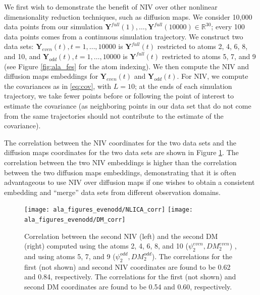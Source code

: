 \documentclass[aip,jcp,reprint,twocolumn]{revtex4-1}
\begin{document}
We first wish to demonstrate the benefit of NIV over other nonlinear dimensionality reduction techniques, such as diffusion maps.
%
We consider 10,000 data points from our simulation $\mathbf{Y}^{full}(1), \dots, \mathbf{Y}^{full}(10000) \in \mathbb{R}^{30}$; every 100 data points comes from a continuous simulation trajectory.
%
We construct two data sets:
%
$\mathbf{Y}_{even}(t), t=1, \dots, 10000$ is $\mathbf{Y}^{full}(t)$ restricted to atoms 2, 4, 6, 8, and 10,
and $\mathbf{Y}_{odd}(t), t=1, \dots, 10000$ is $\mathbf{Y}^{full}(t)$ restricted to atoms 5, 7, and 9 (see Figure \ref{fig:ala_fes} for the atom indexing).
%
We then compute the NIV and diffusion maps embeddings for $\mathbf{Y}_{even}(t)$ and $\mathbf{Y}_{odd}(t)$.
%
For NIV, we compute the covariances as in \eqref{eq:cov}, with $L=10$;
at the ends of each simulation trajectory, we take fewer points before or following the point of interest to estimate the covariance
(as neighboring points in our data set that do not come from the
same trajectories should not contribute to the estimate of the covariance).

The correlation between the NIV coordinates for the two data sets and the diffusion maps coordinates for the two data sets are shown in Figure \ref{fig:ala_corr}.
%
The correlation between the two NIV embeddings is higher than the correlation between the two diffusion maps embeddings,
demonstrating that it is often advantageous to use NIV over diffusion maps if one wishes to obtain a consistent embedding and ``merge'' data sets from different observation domains.

\begin{figure}[ht]
    \texttt{[image: ala\_figures\_evenodd/NLICA\_corr]}
    \texttt{[image: ala\_figures\_evenodd/DM\_corr]}
    \caption{Correlation between the second NIV (left) and the second DM (right) computed using the atoms 2, 4, 6, 8, and 10 ($\psi_2^{even}, DM_2^{even}$) , and using atoms 5, 7, and 9 ($\psi_2^{odd}, DM_2^{odd}$).
    The correlations for the first (not shown) and second NIV coordinates are found to be 0.62 and 0.84, respectively.
    The correlations for the first (not shown) and second DM coordinates are found to be 0.54 and 0.60, respectively. }
    \label{fig:ala_corr}
\end{figure}

\end{document}
